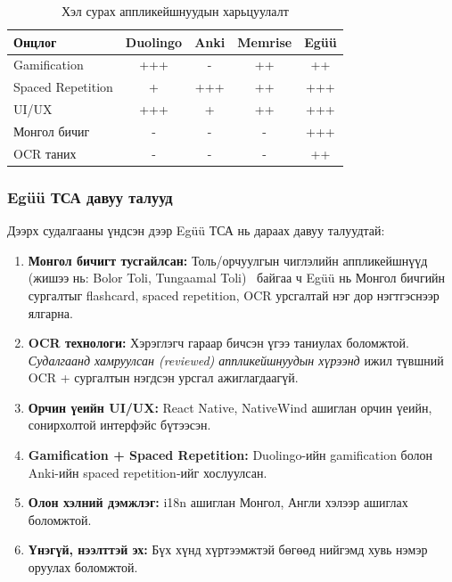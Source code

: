 \begin{table}[H]
\centering
\caption{Хэл сурах аппликейшнуудын харьцуулалт}
\label{tab:app-comparison}
\begin{tabular}{|l|c|c|c|c|}
\hline
\textbf{Онцлог} & \textbf{Duolingo} & \textbf{Anki} & \textbf{Memrise} & \textbf{Egüü} \\
\hline
Gamification & +++ & - & ++ & ++ \\
\hline
Spaced Repetition & + & +++ & ++ & +++ \\
\hline
UI/UX & +++ & + & ++ & +++ \\
\hline
Монгол бичиг & - & - & - & +++ \\
\hline
OCR таних & - & - & - & ++ \\
\hline
\end{tabular}
\end{table}
\subsubsection{Egüü ТСА давуу талууд}

Дээрх судалгааны үндсэн дээр Egüü ТСА нь дараах давуу талуудтай:

\begin{enumerate}
    \item \textbf{Монгол бичигт тусгайлсан:} Толь/орчуулгын чиглэлийн аппликейшнүүд (жишээ нь: Bolor Toli, Tungaamal Toli)~\cite{bolor-toli,tungaamal-toli} байгаа ч Egüü нь Монгол бичгийн сургалтыг flashcard, spaced repetition, OCR урсгалтай нэг дор нэгтгэснээр ялгарна.
    
    \item \textbf{OCR технологи:} Хэрэглэгч гараар бичсэн үгээ таниулах боломжтой. \textit{Судалгаанд хамруулсан (reviewed) аппликейшнуудын хүрээнд} ижил түвшний OCR + сургалтын нэгдсэн урсгал ажиглагдаагүй.
    
    \item \textbf{Орчин үеийн UI/UX:} React Native, NativeWind ашиглан орчин үеийн, сонирхолтой интерфэйс бүтээсэн.
    
    \item \textbf{Gamification + Spaced Repetition:} Duolingo-ийн gamification болон Anki-ийн spaced repetition-ийг хослуулсан.
    
    \item \textbf{Олон хэлний дэмжлэг:} i18n ашиглан Монгол, Англи хэлээр ашиглах боломжтой.
    
    \item \textbf{Үнэгүй, нээлттэй эх:} Бүх хүнд хүртээмжтэй бөгөөд нийгэмд хувь нэмэр оруулах боломжтой.
\end{enumerate}

